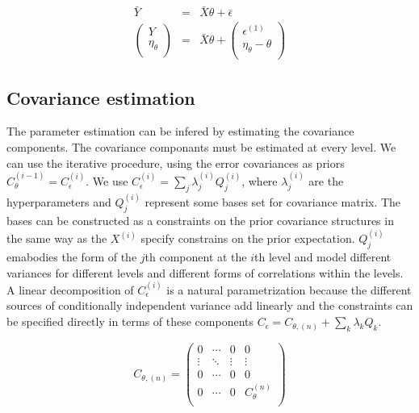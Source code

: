 \documentclass[final, paper=letter,5p,times,twocolumn]{elsarticle}
\theoremstyle{definition}
\begin{document}
\begin{equation}
  \left .
  \begin{array}{rcl}
    \bar{Y} & = & \bar{X}\theta + \bar{\epsilon} \\
    \left (
    \begin{array}{c}
      Y \\
      \eta_{\theta}  \\
    \end{array}
    \right ) & = & \bar{X}\theta + 
    \left (
    \begin{array}{c}
      \epsilon^{(1)} \\
      \eta_{\theta} - \theta  \\
    \end{array}
    \right )
  \end{array}
  \right .
  \label{hierarchical_augmented_model_recursive}
\end{equation}

\subsection{Covariance estimation}

The parameter estimation can be infered by estimating the covariance components. The covariance componants must be estimated at every level. We can use the iterative procedure, using the error covariances as priors $C_{\theta}^{(i-1)} = C_{\epsilon}^{(i)}$. We use $C_{\epsilon}^{(i)} = \sum_{j} \lambda_{j}^{(i)}Q_{j}^{(i)}$, where $\lambda_{j}^{(i)}$ are the hyperparameters and $Q_{j}^{(i)}$ represent some bases set for covariance matrix. The bases can be constructed as a constraints on the prior covariance structures in the same way as the $X^{(i)}$ specify constrains on the prior expectation. $Q_{j}^{(i)}$ emabodies the form of the $j$th component at the $i$th level and model different variances for different levels and different forms of correlations within the levels. A linear decomposition of $C_{\epsilon}^{(i)}$ is a natural parametrization because the different sources of conditionally independent variance add linearly and the constraints can be specified directly in terms of these components $C_{\epsilon} = C_{\theta,(n)} + \sum_{k} \lambda_{k}Q_{k}$.

\begin{equation}
  C_{\theta,(n)} =
  \left (
  \begin{array}{cccc}
    0 & \cdots & 0 & 0 \\
    \vdots & \ddots &\vdots & \vdots \\
    0 & \cdots & 0 & 0 \\
    0 & \cdots & 0 & C_{\theta}^{(n)} \\
  \end{array}
    \right )
  \label{C_theta_n}
\end{equation}
\end{document}
